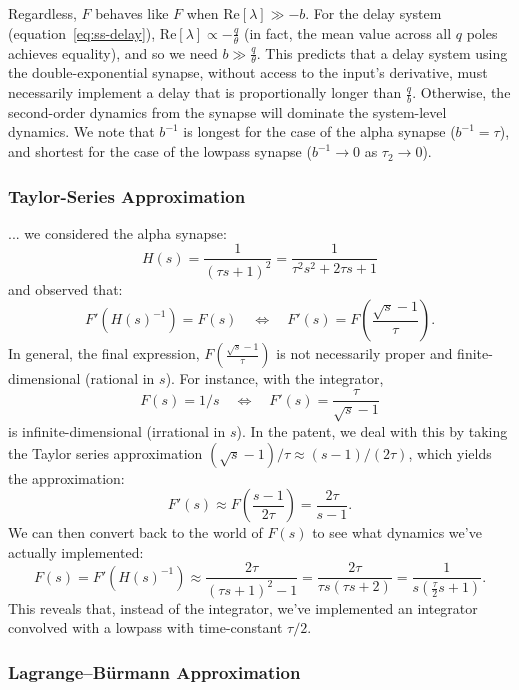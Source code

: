 Regardless, $\hat{F}$ behaves like $F$ when $\text{Re} \left[ \lambda \right] \gg -b$.
For the delay system (equation~\ref{eq:ss-delay}), $\text{Re} \left[ \lambda \right] \propto -\frac{q}{\theta}$ (in fact, the mean value across all $q$ poles achieves equality), and so we need $b \gg \frac{q}{\theta}$.
This predicts that a delay system using the double-exponential synapse, without access to the input's derivative, must necessarily implement a delay that is proportionally longer than $\frac{q}{b}$.
Otherwise, the second-order dynamics from the synapse will dominate the system-level dynamics.
We note that $b^{-1}$ is longest for the case of the alpha synapse ($b^{-1} = \tau$), and shortest for the case of the lowpass synapse ($b^{-1} \rightarrow 0$ as $\tau_2 \rightarrow 0$).



\subsubsection{Taylor-Series Approximation}

...
we considered the alpha synapse:
$$H(s) = \frac{1}{(\tau s + 1)^2} = \frac{1}{\tau^2 s^2 + 2\tau s + 1}$$
and observed that:
$$F' \left( H(s)^{-1} \right) = F(s) \quad \iff \quad F'(s) = F \left( \frac{\sqrt{s} - 1}{\tau} \right) .$$
In general, the final expression, $F \left( \frac{\sqrt{s} - 1}{\tau} \right)$ is not necessarily proper and finite-dimensional (rational in $s$). For instance, with the integrator,
$$F(s) = 1/s \quad \iff \quad F'(s) = \frac{\tau}{\sqrt{s} - 1}$$
is infinite-dimensional (irrational in $s$).
In the patent, we deal with this by taking the Taylor series approximation $(\sqrt{s} - 1) / \tau \approx \left( s - 1 \right) / (2 \tau)$, which yields the approximation: $$F'(s) \approx F \left( \frac{s-1}{2\tau} \right) = \frac{2 \tau}{s - 1} .$$
We can then convert back to the world of $F(s)$ to see what dynamics we've actually implemented:
$$F(s) = F' \left( H(s)^{-1} \right) \approx \frac{2\tau}{(\tau s + 1)^2 - 1} = \frac{2\tau}{\tau s (\tau s + 2)} = \frac{1}{s \left( \frac{\tau}{2} s + 1 \right) } .$$
This reveals that, instead of the integrator, we've implemented an integrator convolved with a lowpass with time-constant $\tau / 2$.

\subsubsection{Lagrange--B\"urmann Approximation}

